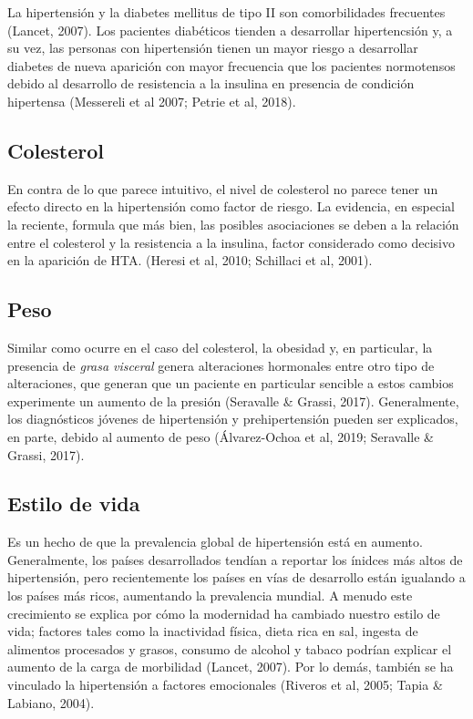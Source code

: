 \documentclass{aa}
\begin{document}
La hipertensión y la diabetes mellitus de tipo II son comorbilidades frecuentes (Lancet, 2007). Los pacientes diabéticos tienden a desarrollar hipertencsión y, a su vez, las personas con hipertensión tienen un mayor riesgo a desarrollar diabetes de nueva aparición con mayor frecuencia que los pacientes normotensos debido al desarrollo de resistencia a la insulina en presencia de condición hipertensa (Messereli et al 2007; Petrie et al, 2018).

\subsection{Colesterol}

En contra de lo que parece intuitivo, el nivel de colesterol no parece tener un efecto directo en la hipertensión como factor de riesgo. La evidencia, en especial la reciente, formula que más bien, las posibles asociaciones se deben a la relación entre el colesterol y la resistencia a la insulina, factor considerado como decisivo en la aparición de HTA. (Heresi et al, 2010; Schillaci et al, 2001).

\subsection{Peso}

Similar como ocurre en el caso del colesterol, la obesidad y, en particular, la presencia de \textit{grasa visceral} genera alteraciones hormonales entre otro tipo de alteraciones, que generan que un paciente en particular sencible a estos cambios experimente un aumento de la presión (Seravalle \& Grassi, 2017). Generalmente, los diagnósticos jóvenes de hipertensión y prehipertensión pueden ser explicados, en parte, debido al aumento de peso (Álvarez-Ochoa et al, 2019; Seravalle \& Grassi, 2017).

\subsection{Estilo de vida}

Es un hecho de que la prevalencia global de hipertensión está en aumento. Generalmente, los países desarrollados tendían a reportar los ínidces más altos de hipertensión, pero recientemente los países en vías de desarrollo están igualando a los países más ricos, aumentando la prevalencia mundial. A menudo este crecimiento se explica por cómo la modernidad ha cambiado nuestro estilo de vida; factores tales como la inactividad física, dieta rica en sal, ingesta de alimentos procesados y grasos, consumo de alcohol y tabaco podrían explicar el aumento de la carga de morbilidad (Lancet, 2007). Por lo demás, también se ha vinculado la hipertensión a factores emocionales (Riveros et al, 2005; Tapia \& Labiano, 2004).
\end{document}
